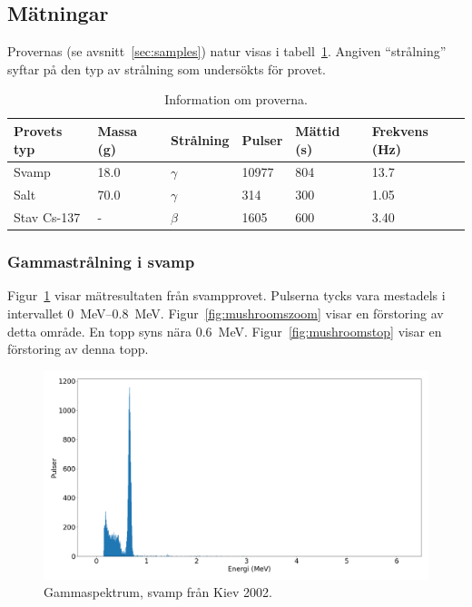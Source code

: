 \subsection{Mätningar} \label{sec:measurements}

Provernas (se avsnitt~\ref{sec:samples}) natur visas i
tabell~\ref{tab:samples}. Angiven ``strålning'' syftar på den typ av strålning
som undersökts för provet.

\begin{table}[!hp]
    \begin{tabular}{|l|l|l|l|l|l|}
    \hline
    Provets typ & Massa (\unit{g}) & Strålning & Pulser      & Mättid (\unit{s}) & Frekvens (\unit{\Hz}) \\
    \hline
    Svamp       & \num{18.0}       & $\gamma$  & \num{10977} & \num{804}         & \num{13.7}            \\
    \hline
    Salt        & \num{70.0}       & $\gamma$  & \num{314}   & \num{300}         & \num{1.05}            \\
    \hline
    Stav Cs-137 & -                & $\beta$   & \num{1605}  & \num{600}         & \num{3.40}            \\
    \hline
    \end{tabular}
    \caption{Information om proverna.}
    \label{tab:samples}
\end{table}

\subsubsection{Gammastrålning i svamp} \label{sec:mushrooms}

Figur~\ref{fig:mushrooms} visar mätresultaten från svampprovet. Pulserna tycks
vara mestadels i intervallet \qtyrange{0}{0.8}{\MeV}.
Figur~\ref{fig:mushroomszoom} visar en förstoring av detta område. En topp syns
nära \qty{0.6}{\MeV}. Figur~\ref{fig:mushroomstop} visar en förstoring av denna
topp.

\begin{figure}[!hp]
    \centering
    \includegraphics[width=\textwidth, keepaspectratio]{../images/mushrooms.png}
    \caption{Gammaspektrum, svamp från Kiev 2002.}
    \label{fig:mushrooms}
\end{figure}

